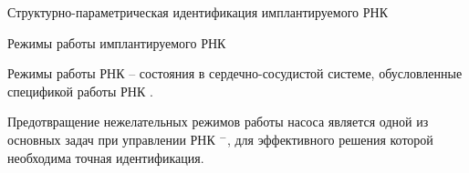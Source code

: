 \documentclass[a4paper, 9pt]{beamer}
\begin{document}
\begin{frame}{Структурно-параметрическая идентификация имплантируемого РНК}
\begin{minipage}[ht]{0.62\textwidth}
\end{minipage}

\end{frame}


\begin{frame}{Режимы работы имплантируемого РНК}

\footnotesize %
Режимы работы РНК -- состояния в сердечно-сосудистой системе, обусловленные спецификой работы РНК \footnotemark[1].%

Предотвращение нежелательных режимов работы насоса является одной из основных задач при управлении РНК \footnotemark[2]$^-$\footnotemark[4], для эффективного решения которой необходима точная идентификация.


\end{frame}
\end{document}
